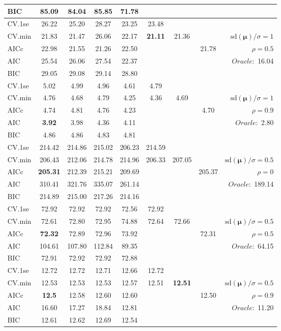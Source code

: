 \begin{table}
\begin{center}
\begin{tabular}{l*{7}{c}|r}
BIC & 85.09 & 84.04 & 85.85 & 71.78 & & & &  \\
 \hline 
CV.1se & 26.22 & 25.20 & 28.27 & 23.25 & 23.48 & & & \\
CV.min & 21.83 & 21.47 & 26.06 & 22.17 & {\bf 21.11} & 21.36 & & $\mathrm{sd}(\mathbf{\mu})/\sigma=1$ \\
AICc & 22.98 & 21.55 & 21.26 & 22.50 & & & 21.78 &  $\rho=0.5$ \\
AIC & 25.54 & 26.06 & 27.54 & 22.37 & & & &  \multirow{2}{*}{$Oracle: $ 16.04} \\
BIC & 29.05 & 29.08 & 29.14 & 28.80 & & & &  \\
 \hline 
CV.1se & 5.02 & 4.99 & 4.96 & 4.61 & 4.79 & & & \\
CV.min & 4.76 & 4.68 & 4.79 & 4.25 & 4.36 & 4.69 & & $\mathrm{sd}(\mathbf{\mu})/\sigma=1$ \\
AICc & 4.74 & 4.81 & 4.76 & 4.23 & & & 4.70 &  $\rho=0.9$ \\
AIC & {\bf 3.92} & 3.98 & 4.36 & 4.11 & & & &  \multirow{2}{*}{$Oracle: $ 2.80} \\
BIC & 4.86 & 4.86 & 4.83 & 4.81 & & & &  \\
 \hline 
CV.1se & 214.42 & 214.86 & 215.02 & 206.23 & 214.59 & & & \\
CV.min & 206.43 & 212.06 & 214.78 & 214.96 & 206.33 & 207.05 & & $\mathrm{sd}(\mathbf{\mu})/\sigma=0.5$ \\
AICc & {\bf 205.31} & 212.39 & 215.21 & 209.69 & & & 205.37 &  $\rho=0$ \\
AIC & 310.41 & 321.76 & 335.07 & 261.14 & & & &  \multirow{2}{*}{$Oracle: $ 189.14} \\
BIC & 214.89 & 215.00 & 217.26 & 214.16 & & & &  \\
 \hline 
CV.1se & 72.92 & 72.92 & 72.92 & 72.56 & 72.92 & & & \\
CV.min & 72.61 & 72.80 & 72.95 & 74.88 & 72.64 & 72.66 & & $\mathrm{sd}(\mathbf{\mu})/\sigma=0.5$ \\
AICc & {\bf 72.32} & 72.89 & 72.96 & 73.92 & & & 72.31 &  $\rho=0.5$ \\
AIC & 104.61 & 107.80 & 112.84 & 89.35 & & & &  \multirow{2}{*}{$Oracle: $ 64.15} \\
BIC & 72.91 & 72.92 & 72.92 & 72.88 & & & &  \\
 \hline 
CV.1se & 12.72 & 12.72 & 12.71 & 12.66 & 12.72 & & & \\
CV.min & 12.53 & 12.53 & 12.53 & 12.57 & 12.51 & {\bf 12.51} & & $\mathrm{sd}(\mathbf{\mu})/\sigma=0.5$ \\
AICc & {\bf 12.5} & 12.58 & 12.60 & 12.60 & & & 12.50 &  $\rho=0.9$ \\
AIC & 16.60 & 17.27 & 18.84 & 12.81 & & & &  \multirow{2}{*}{$Oracle: $ 11.20} \\
BIC & 12.61 & 12.62 & 12.69 & 12.54 & & & &  \\
 \hline 
\end{tabular}
\end{center}
\vspace{-1cm}
\end{table}




